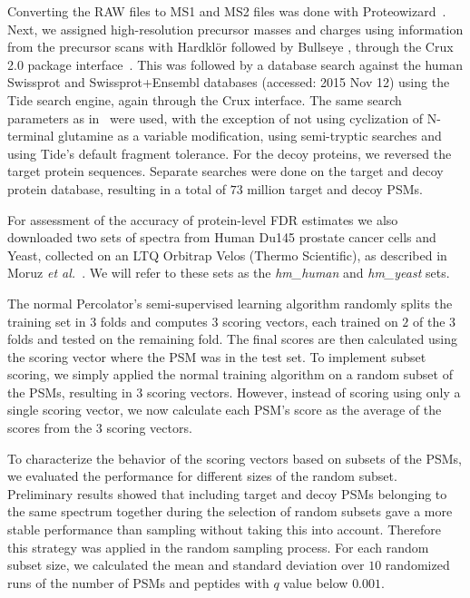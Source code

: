 \documentclass{article}
\begin{document}
Converting the RAW files to MS1 and MS2 files was done with
Proteowizard~\cite{kessner2008}. Next, we assigned high-resolution
precursor masses and charges using information from the precursor
scans with Hardkl\"{o}r \cite{hoopmann2007} followed by Bullseye
\cite{hsieh2009}, through the Crux 2.0 package
interface~\cite{mcilwain2014}. This was followed by a database search
against the human Swissprot and Swissprot+Ensembl databases
(accessed: 2015 Nov 12) using the Tide search engine, again through
the Crux interface. The same search parameters as
in~\cite{kim2014draft} were used, with the exception of not
using cyclization of N-terminal glutamine as a variable modification,
using semi-tryptic searches and using Tide's default fragment
tolerance. For the decoy proteins, we reversed the target
protein sequences. Separate searches were done on the target and decoy
protein database, resulting in a total of $73$ million target and
decoy PSMs.

For assessment of the accuracy of protein-level FDR estimates we also
downloaded two sets of spectra from Human Du145 prostate cancer cells
and Yeast, collected on an LTQ Orbitrap Velos (Thermo Scientific), as
described in Moruz {\em et  al.}~\cite{moruz2013}.  We will refer to
these sets as the {\em hm\_human} and {\em hm\_yeast} sets.

The normal Percolator's semi-supervised learning algorithm randomly
splits the training set in $3$ folds and computes $3$ scoring vectors,
each trained on $2$ of the $3$ folds and tested on the remaining
fold. The final scores are then calculated using the scoring vector
where the PSM was in the test set. To implement subset scoring, we
simply applied the normal training algorithm on a random subset of the
PSMs, resulting in $3$ scoring vectors. However, instead
of scoring using only a single scoring vector, we now calculate each
PSM's score as the average of the scores from the $3$ scoring vectors.

To characterize the behavior of the scoring vectors based on subsets
of the PSMs, we evaluated the performance for different sizes of the
random subset. Preliminary results showed that including target and
decoy PSMs belonging to the same spectrum together during the
selection of random subsets gave a more stable performance than
sampling without taking this into account. Therefore this strategy was
applied in the random sampling process. For each random subset
size, we calculated the mean and standard deviation over $10$
randomized runs of the number of PSMs and peptides with $q$ value
below $0.001$.
\end{document}
